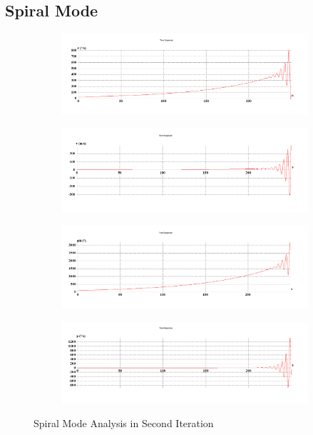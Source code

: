 \subsection{Spiral Mode}
\begin{figure}[H]
\begin{subfigure}{0.48\textwidth}
\includegraphics[width = \linewidth]{r__4_.png}
\end{subfigure}
\begin{subfigure}{0.48\textwidth}
\includegraphics[width = \linewidth]{v__4_.png}
\end{subfigure}
\medskip
\begin{subfigure}{0.48\textwidth}
\includegraphics[width = \linewidth]{phi__4_.png}
\end{subfigure}
\begin{subfigure}{0.48\textwidth}
\includegraphics[width = \linewidth]{p__4_.png}
\end{subfigure}
\caption{Spiral Mode Analysis in Second Iteration}
\end{figure}
